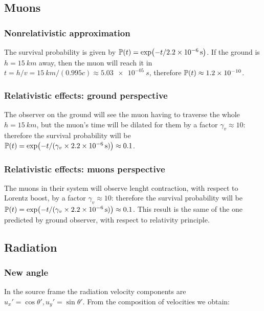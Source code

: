 \documentclass[main.tex]{subfiles}
\begin{document}
\subsection{Muons}

\subsubsection{Nonrelativistic approximation}

The survival probability is given by \(\mathbb{P} (t) = \exp(-t/ \SI{2.2e-6}{s})\). If the ground is \( h =\SI{15}{km} \) away, then the muon will reach it in \(t = h/v = \SI{15}{km} / (0.995c) \approx \SI{5.03e-05}{s}\), therefore \(\mathbb{P}(t) \approx \num{1.2e-10} \).

\subsubsection{Relativistic effects: ground perspective}

The observer on the ground will see the muon having to traverse the whole \(h = \SI{15}{km} \), but the muon's time will be dilated for them by a factor \(\gamma_v \approx 10\): therefore the survival probability
will be \(\mathbb{P}(t) = \exp(- t / (\gamma_v \times \SI{2.2e-6}{s})) \approx 0.1\).


\subsubsection{Relativistic effects: muons perspective}

The muons in their system will observe lenght contraction, with respect to Lorentz boost, by a factor \(\gamma_v \approx 10\): therefore the survival probability
will be \(\mathbb{P}(t) = \exp(- t / (\gamma_v \times \SI{2.2e-6}{s})) \approx 0.1\). This result is the same of the one predicted by ground observer, with respect to relativity principle.


\subsection{Radiation}

\subsubsection{New angle}
In the source frame the radiation velocity components are \( u_x' = \cos\theta', u_y' = \sin\theta' \). From the composition of velocities we obtain:
\end{document}
